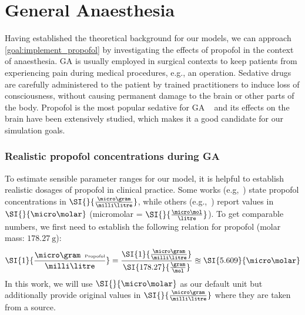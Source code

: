 \section{General Anaesthesia}\label{sec:general-anaesthesia}
Having established the theoretical background for our models,
we can approach \ref{goal:implement_propofol} by investigating the effects of propofol in the context of anaesthesia.
GA is usually employed in surgical contexts to keep patients from experiencing pain during medical
procedures, e.g., an operation.
Sedative drugs are carefully administered to the patient by trained practitioners to induce loss of consciousness,
without causing permanent damage to the brain or other parts of the body.
Propofol is the most popular sedative for GA ~\cite{miner_clinical_2007, sahinovic_clinical_2018}
and its effects on the brain have been extensively studied,
which makes it a good candidate for our simulation goals.

\subsubsection{Realistic propofol concentrations during GA}\label{subsubsec:realistic-prop-conc-during-ga}
To estimate sensible parameter ranges for our model,
it is helpful to establish realistic dosages of propofol in clinical practice.
Some works (e.g,~\cite{iwakiri_individual_2005, ferreira_patterns_2020}) state propofol concentrations in $\SI{}{\frac{\micro\gram}{\milli\litre}}$,
while others (e.g.,~\cite{kitamura_effects_2003, mcdougall_propofol_2008}) report values in $\SI{}{\micro\molar}$ (micromolar =
$\SI{}{\frac{\micro\mol}{\litre}}$).
To get comparable numbers, we first need to establish the following relation for propofol
(molar mass: $\SI{178.27}{\gram}$):
\[ \SI{1}{\frac{\micro\gram\hspace{0.5em}\text{\tiny{Propofol}}}{\milli\litre}}  =
\frac{ \SI{1}{\frac{\micro\gram}{\milli\litre}}}{\SI{178.27}{\frac{\gram}{\mol}}} \approxeq \SI{5.609}{\micro\molar} \]
In this work, we will use $\SI{}{\micro\molar}$ as our default unit
but additionally provide original values in $\SI{}{\frac{\micro\gram}{\milli\litre}}$ where they are taken from a source.

